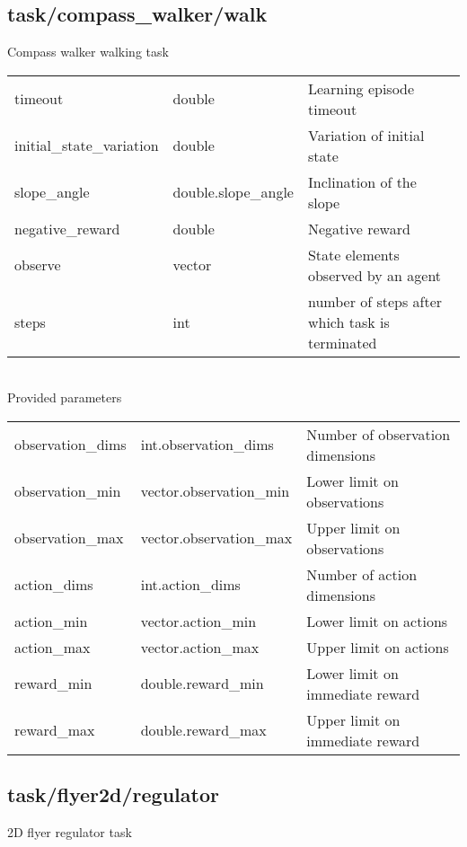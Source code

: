 \subsection{task/compass\_walker/walk}
\noindent Compass walker walking task\\

\noindent\begin{tabular}{@{}lll@{}}
timeout&double&Learning episode timeout\\
initial\_state\_variation&double&Variation of initial state\\
slope\_angle&double.slope\_angle&Inclination of the slope\\
negative\_reward&double&Negative reward\\
observe&vector&State elements observed by an agent\\
steps&int&number of steps after which task is terminated\\
\end{tabular}
\\

\noindent Provided parameters\\

\noindent\begin{tabular}{@{}lll@{}}
observation\_dims&int.observation\_dims&Number of observation dimensions\\
observation\_min&vector.observation\_min&Lower limit on observations\\
observation\_max&vector.observation\_max&Upper limit on observations\\
action\_dims&int.action\_dims&Number of action dimensions\\
action\_min&vector.action\_min&Lower limit on actions\\
action\_max&vector.action\_max&Upper limit on actions\\
reward\_min&double.reward\_min&Lower limit on immediate reward\\
reward\_max&double.reward\_max&Upper limit on immediate reward\\
\end{tabular}
\subsection{task/flyer2d/regulator}
\noindent 2D flyer regulator task\\

